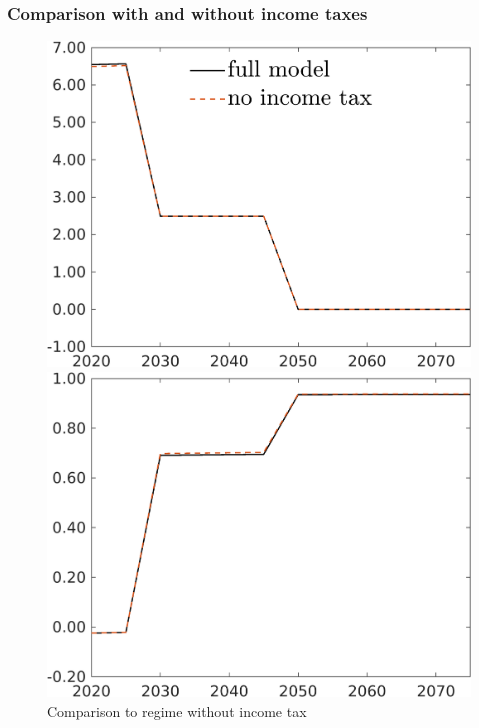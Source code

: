 \subsubsection{Comparison with and without income taxes}\label{subsub:withwithout}
\begin{figure}[h!!]
	\centering
	\caption{Comparison to regime without income tax }\label{fig:Compno_taul_BN0}
	\begin{minipage}[]{0.32\textwidth}
		\includegraphics[width=1\textwidth]{../../codding_model/own_basedOnFried/optimalPol_elastS_DisuSci/figures/all_1705/comp_notaul_OPT_T_NoTaus_Emnet_spillover0_sep1_BN0_ineq0_red0_etaa0.79_lgd1.png}
	\end{minipage}
	\begin{minipage}[]{0.32\textwidth}
		\includegraphics[width=1\textwidth]{../../codding_model/own_basedOnFried/optimalPol_elastS_DisuSci/figures/all_1705/comp_notaul_OPT_T_NoTaus_tauf_spillover0_sep1_BN0_ineq0_red0_etaa0.79_lgd0.png}

\end{minipage}
\end{figure}
